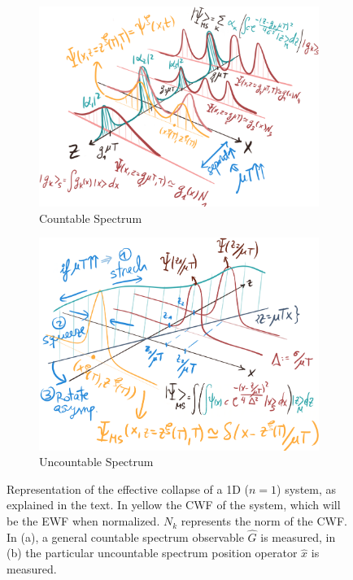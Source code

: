 \documentclass[11pt, a4paper]{article} %
\begin{document}
\begin{figure}[h!]
  \centering
\begin{subfigure}[b]{0.46\linewidth}
    \includegraphics[width=\linewidth]{Figures/Countable.png}
    \caption{Countable Spectrum}
     \end{subfigure}
\begin{subfigure}[b]{0.45\linewidth}
    \includegraphics[width=\linewidth]{Figures/Uncountable.png}
    \caption{Uncountable Spectrum}
     \end{subfigure}
   \caption{Representation of the effective collapse of a 1D ($n=1$) system, as explained in the text. In yellow the CWF of the system, which will be the EWF when normalized. $N_k$ represents the norm of the CWF. In (a), a general countable spectrum observable $\hat{G}$ is measured, in (b) the particular uncountable spectrum position operator $\hat{x}$ is measured. }
  \label{fig:collapse}
\end{figure}
\end{document}
